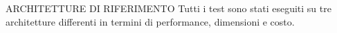 \begin{frame}{ARCHITETTURE DI RIFERIMENTO}
    Tutti i test sono stati eseguiti su tre architetture differenti in termini di performance, dimensioni e costo.
     
    
\end{frame}